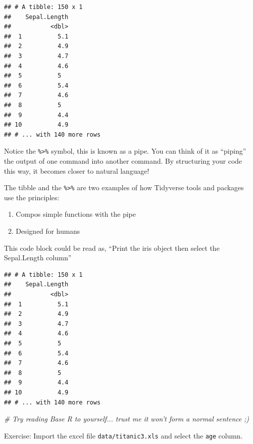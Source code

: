 \documentclass[
]{article}
\newenvironment{Shaded}{\begin{snugshade}}{\end{snugshade}}
\newcommand{\CommentTok}[1]{\textcolor[rgb]{0.56,0.35,0.01}{\textit{#1}}}
\newcommand{\KeywordTok}[1]{\textcolor[rgb]{0.13,0.29,0.53}{\textbf{#1}}}
\newcommand{\NormalTok}[1]{#1}
\newcommand{\OperatorTok}[1]{\textcolor[rgb]{0.81,0.36,0.00}{\textbf{#1}}}
\newcommand{\StringTok}[1]{\textcolor[rgb]{0.31,0.60,0.02}{#1}}
\providecommand{\tightlist}{%
  \setlength{\itemsep}{0pt}\setlength{\parskip}{0pt}}
\begin{document}
\begin{verbatim}
## # A tibble: 150 x 1
##    Sepal.Length
##           <dbl>
##  1          5.1
##  2          4.9
##  3          4.7
##  4          4.6
##  5          5  
##  6          5.4
##  7          4.6
##  8          5  
##  9          4.4
## 10          4.9
## # ... with 140 more rows
\end{verbatim}

Notice the \texttt{\%\textgreater{}\%} symbol, this is known as a pipe.
You can think of it as ``piping'' the output of one command into another
command. By structuring your code this way, it becomes closer to natural
language!

The tibble and the \texttt{\%\textgreater{}\%} are two examples of how
Tidyverse tools and packages use the principles:

\begin{enumerate}
\def\labelenumi{(\arabic{enumi})}
\tightlist
\item
  Compos simple functions with the pipe
\item
  Designed for humans
\end{enumerate}

This code block could be read as, ``Print the iris object then select
the Sepal.Length column''

\begin{Shaded}
\end{Shaded}

\begin{verbatim}
## # A tibble: 150 x 1
##    Sepal.Length
##           <dbl>
##  1          5.1
##  2          4.9
##  3          4.7
##  4          4.6
##  5          5  
##  6          5.4
##  7          4.6
##  8          5  
##  9          4.4
## 10          4.9
## # ... with 140 more rows
\end{verbatim}

\begin{Shaded}
\begin{Highlighting}[]
\CommentTok{# Try reading Base R to yourself... trust me it won't form a normal sentence ;)}
\end{Highlighting}
\end{Shaded}

Exercise: Import the excel file \texttt{data/titanic3.xls} and select
the \texttt{age} column.
\end{document}
